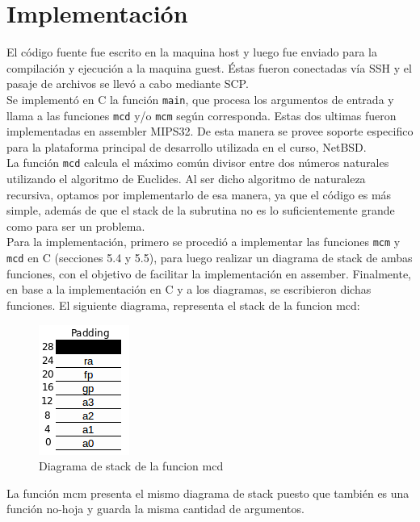 \documentclass[a4paper,10pt]{article}
\def\code#1{\texttt{#1}}
\begin{document}
\section{Implementación}
    El código fuente fue escrito en la maquina host y luego fue enviado para la compilación y ejecución a la maquina guest. Éstas fueron conectadas vía SSH y el pasaje de archivos se llevó a cabo mediante SCP.\\
    Se implementó en C la función \code{main}, que procesa los argumentos de entrada y llama a las funciones \code{mcd} y/o \code{mcm} según corresponda. Estas dos ultimas fueron implementadas en assembler MIPS32. De esta manera se provee soporte especifico para la plataforma principal de desarrollo utilizada en el curso, NetBSD.\\
    La función \code{mcd} calcula el máximo común divisor entre dos números naturales utilizando el algoritmo de Euclides. Al ser dicho algoritmo de naturaleza recursiva, optamos por implementarlo de esa manera, ya que el código es más simple, además de que el stack de la subrutina no es lo suficientemente grande como para ser un problema.\\
    Para la implementación, primero se procedió a implementar las funciones \code{mcm} y \code{mcd} en C (secciones 5.4 y 5.5), para luego realizar un diagrama de stack de ambas funciones, con el objetivo de facilitar la implementación en assember. Finalmente, en base a la implementación en C y a los diagramas, se escribieron dichas funciones. El siguiente diagrama, representa el stack de la funcion mcd:\\
    
    \begin{figure}[H]
        \centering
        \includegraphics[scale=0.6]{DS_mcd.png}
        \caption{Diagrama de stack de la funcion mcd}
        \label{fig:my_label}
    \end{figure}
    
    La función mcm presenta el mismo diagrama de stack puesto que también es una función no-hoja y guarda la misma cantidad de argumentos.\\
\end{document}
